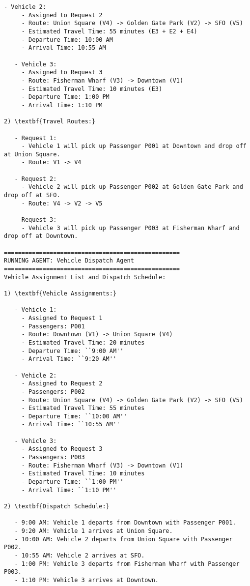 \begin{lstlisting}[style=JSONStyle, caption=Sample JSON Output from Agentic Workflow, label=lst:data_collectionp3p4]
   - Vehicle 2:
     - Assigned to Request 2
     - Route: Union Square (V4) -> Golden Gate Park (V2) -> SFO (V5)
     - Estimated Travel Time: 55 minutes (E3 + E2 + E4)
     - Departure Time: 10:00 AM
     - Arrival Time: 10:55 AM

   - Vehicle 3:
     - Assigned to Request 3
     - Route: Fisherman Wharf (V3) -> Downtown (V1)
     - Estimated Travel Time: 10 minutes (E3)
     - Departure Time: 1:00 PM
     - Arrival Time: 1:10 PM

2) \textbf{Travel Routes:}

   - Request 1:
     - Vehicle 1 will pick up Passenger P001 at Downtown and drop off at Union Square.
     - Route: V1 -> V4

   - Request 2:
     - Vehicle 2 will pick up Passenger P002 at Golden Gate Park and drop off at SFO.
     - Route: V4 -> V2 -> V5

   - Request 3:
     - Vehicle 3 will pick up Passenger P003 at Fisherman Wharf and drop off at Downtown.

==================================================
RUNNING AGENT: Vehicle Dispatch Agent
==================================================
Vehicle Assignment List and Dispatch Schedule:

1) \textbf{Vehicle Assignments:}

   - Vehicle 1:
     - Assigned to Request 1
     - Passengers: P001
     - Route: Downtown (V1) -> Union Square (V4)
     - Estimated Travel Time: 20 minutes
     - Departure Time: ``9:00 AM''
     - Arrival Time: ``9:20 AM''

   - Vehicle 2:
     - Assigned to Request 2
     - Passengers: P002
     - Route: Union Square (V4) -> Golden Gate Park (V2) -> SFO (V5)
     - Estimated Travel Time: 55 minutes
     - Departure Time: ``10:00 AM''
     - Arrival Time: ``10:55 AM''

   - Vehicle 3:
     - Assigned to Request 3
     - Passengers: P003
     - Route: Fisherman Wharf (V3) -> Downtown (V1)
     - Estimated Travel Time: 10 minutes
     - Departure Time: ``1:00 PM''
     - Arrival Time: ``1:10 PM''

2) \textbf{Dispatch Schedule:}

   - 9:00 AM: Vehicle 1 departs from Downtown with Passenger P001.
   - 9:20 AM: Vehicle 1 arrives at Union Square.
   - 10:00 AM: Vehicle 2 departs from Union Square with Passenger P002.
   - 10:55 AM: Vehicle 2 arrives at SFO.
   - 1:00 PM: Vehicle 3 departs from Fisherman Wharf with Passenger P003.
   - 1:10 PM: Vehicle 3 arrives at Downtown.


\end{lstlisting}
